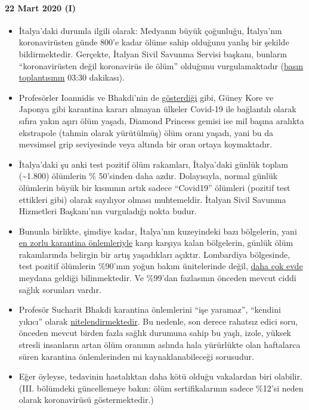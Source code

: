 \hypertarget{22-mart-2020-i}{%
\paragraph{22 Mart 2020 (I)}\label{22-mart-2020-i}}

\begin{itemize}
\tightlist
\item
  İtalya'daki durumla ilgili olarak: Medyanın büyük çoğunluğu,
  İtalya'nın koronavirüsten günde 800'e kadar ölüme sahip olduğunu
  yanlış bir şekilde bildirmektedir. Gerçekte, İtalyan Sivil Savunma
  Servisi başkanı, bunların ``koronavirüsten değil koronavirüs ile
  ölüm'' olduğunu vurgulamaktadır
  (\href{https://youtu.be/0M4kbPDHGR0?t=210}{basın toplantısının} 03:30
  dakikası). 
\item
  Profesörler Ioannidis ve Bhakdi'nin de
  \href{https://www.statnews.com/2020/03/17/a-fiasco-in-the-making-as-the-coronavirus-pandemic-takes-hold-we-are-making-decisions-without-reliable-data/}{gösterdiği}
  gibi, Güney Kore ve Japonya gibi karantina kararı almayan ülkeler
  Covid-19 ile bağlantılı olarak sıfıra yakın aşırı ölüm yaşadı, Diamond
  Princess gemisi ise mil başına aralıkta ekstrapole (tahmin olarak
  yürütülmüş) ölüm oranı yaşadı, yani bu da mevsimsel grip seviyesinde
  veya altında bir oran ortaya koymaktadır.
\item
  İtalya'daki şu anki test pozitif ölüm rakamları, İtalya'daki günlük
  toplam (\textasciitilde{}1.800) ölümlerin \% 50'sinden daha azdır.
  Dolayısıyla, normal günlük ölümlerin büyük bir kısmının artık sadece
  ``Covid19'' ölümleri (pozitif test ettikleri gibi) olarak sayılıyor
  olması muhtemeldir. İtalyan Sivil Savunma Hizmetleri Başkanı'nın
  vurguladığı nokta budur.
\item
  Bununla birlikte, şimdiye kadar, İtalya'nın kuzeyindeki bazı
  bölgelerin, yani
  \href{https://en.wikipedia.org/wiki/2020_Italy_coronavirus_lockdown}{en
  zorlu karantina önlemleriyle} karşı karşıya kalan bölgelerin, günlük
  ölüm rakamlarında belirgin bir artış yaşadıkları açıktır. Lombardiya
  bölgesinde, test pozitif ölümlerin \%90'ının yoğun bakım ünitelerinde
  değil,
  \href{https://www.tgcom24.mediaset.it/cronaca/coronavirus-in-lombardia-9-morti-su-10-mai-giunti-in-terapia-intensiva_16362350-202002a.shtml}{daha
  çok evde} meydana geldiği bilinmektedir. Ve \%99'dan fazlasının
  önceden mevcut ciddi sağlık sorunları vardır.
\item
  Profesör Sucharit Bhakdi karantina önlemlerini ``işe yaramaz'',
  ``kendini yıkıcı'' olarak
  \href{https://www.youtube.com/watch?v=JBB9bA-gXL4}{nitelendirmektedir}.
  Bu nedenle, son derece rahatsız edici soru, önceden mevcut birden
  fazla sağlık durumuna sahip bu yaşlı, izole, yüksek stresli insanların
  artan ölüm oranının aslında hala yürürlükte olan haftalarca süren
  karantina önlemlerinden mi kaynaklanabileceği sorusudur.
\item
  Eğer öyleyse, tedavinin hastalıktan daha kötü olduğu vakalardan biri
  olabilir. (III. bölümdeki güncellemeye bakın: ölüm sertifikalarının
  sadece \%12'si neden olarak koronavirüsü göstermektedir.)
\end{itemize}

